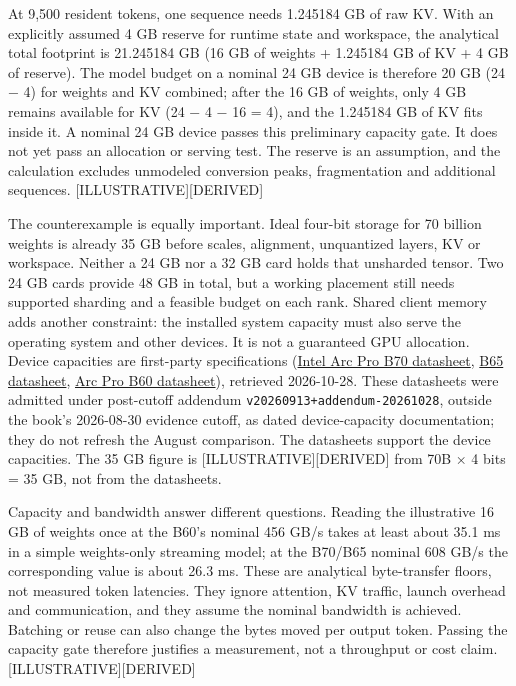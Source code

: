 At 9,500 resident tokens, one sequence needs 1.245184 GB of raw KV. With
an explicitly assumed 4 GB reserve for runtime state and workspace, the
analytical total footprint is 21.245184 GB (16 GB of weights + 1.245184
GB of KV + 4 GB of reserve). The model budget on a nominal 24 GB device
is therefore 20 GB (24 − 4) for weights and KV combined; after the 16 GB
of weights, only 4 GB remains available for KV (24 − 4 − 16 = 4), and
the 1.245184 GB of KV fits inside it. A nominal 24 GB device passes this
preliminary capacity gate. It does not yet pass an allocation or serving
test. The reserve is an assumption, and the calculation excludes
unmodeled conversion peaks, fragmentation and additional sequences.
\mbox{{[}ILLUSTRATIVE{]}}\hspace{0pt}\mbox{{[}DERIVED{]}}

The counterexample is equally important. Ideal four-bit storage for 70
billion weights is already 35 GB before scales, alignment, unquantized
layers, KV or workspace. Neither a 24 GB nor a 32 GB card holds that
unsharded tensor. Two 24 GB cards provide 48 GB in total, but a working
placement still needs supported sharding and a feasible budget on each
rank. Shared client memory adds another constraint: the installed system
capacity must also serve the operating system and other devices. It is
not a guaranteed GPU allocation. Device capacities are first-party
specifications
(\href{https://intel.com/content/dam/www/central-libraries/us/en/documents/2026-03/datasheet-b70-gpu.pdf}{Intel
Arc Pro B70 datasheet},
\href{https://intel.com/content/dam/www/central-libraries/us/en/documents/2026-03/datasheet-b65-gpu.pdf}{B65
datasheet},
\href{https://download.intel.com/newsroom/2025/client-computing/Intel-Arc-Pro-B60-Data-Sheet.pdf}{Arc
Pro B60 datasheet}), retrieved 2026-10-28. These datasheets were
admitted under post-cutoff addendum
\texttt{v20260913+addendum-20261028}, outside the book's 2026-08-30
evidence cutoff, as dated device-capacity documentation; they do not
refresh the August comparison. The datasheets support the device
capacities. The 35 GB figure is \mbox{{[}ILLUSTRATIVE{]}}\hspace{0pt}\mbox{{[}DERIVED{]}} from 70B
× 4 bits = 35 GB, not from the datasheets.

Capacity and bandwidth answer different questions. Reading the
illustrative 16 GB of weights once at the B60's nominal 456 GB/s takes
at least about 35.1 ms in a simple weights-only streaming model; at the
B70/B65 nominal 608 GB/s the corresponding value is about 26.3 ms. These
are analytical byte-transfer floors, not measured token latencies. They
ignore attention, KV traffic, launch overhead and communication, and
they assume the nominal bandwidth is achieved. Batching or reuse can
also change the bytes moved per output token. Passing the capacity gate
therefore justifies a measurement, not a throughput or cost claim.
\mbox{{[}ILLUSTRATIVE{]}}\hspace{0pt}\mbox{{[}DERIVED{]}}

